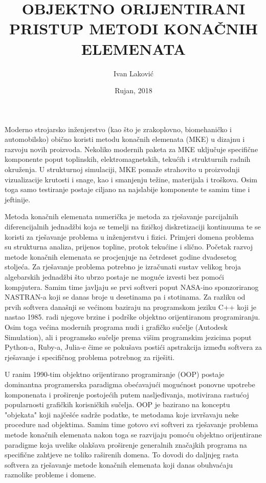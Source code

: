 \documentclass[a4paper,twoside,12pt]{memoir} %
\title{OBJEKTNO ORIJENTIRANI PRISTUP METODI KONAČNIH ELEMENATA}
\author{Ivan Laković}
\date{Rujan, 2018}  %
\begin{document}
\frontmatter


\begin{intro}
Moderno strojarsko inženjerstvo (kao što je zrakoplovno, biomehaničko i automobilsko) obično koristi metodu konačnih elemenata (MKE) u dizajnu i razvoju novih proizvoda. Nekoliko modernih paketa za MKE uključuje specifične komponente poput toplinskih, elektromagnetskih, tekućih i strukturnih radnih okruženja. U strukturnoj simulaciji, MKE pomaže strahovito u proizvodnji vizualizacije krutosti i snage, kao i smanjenju težine, materijala i troškova. Osim toga samo testiranje postaje ciljano na najslabije komponente te samim time i jeftinije. \cite{wiki_fem_18} \par

Metoda konačnih elemenata numerička je metoda za rješavanje parcijalnih diferencijalnih jednadžbi koja se temelji na fizičkoj diskretizaciji kontinuuma te se koristi za rješavanje problema u inženjerstvu i fizici. Primjeri domena problema su strukturna analiza, prijenos topline, protok tekućine i slično. Početak razvoj metode konačnih elemenata se procjenjuje na četrdeset godine dvadesetog stoljeća. Za rješavanje problema potrebno je izračunati sustav velikog broja algebarskih jednadžbi što ubrzo postaje ne moguće izvesti bez pomoći kompjutera. Samim time javljaju se prvi softveri poput NASA-ino sponzoriranog NASTRAN-a koji se danas broje u desetinama pa i stotinama. Za razliku od prvih softvera današnji se većinom baziraju na programskom jeziku C++ koji je nastao 1985. radi njegove brzine i podrške objektno orijentiranom programiranju. Osim toga većina modernih programa nudi i grafičko sučelje (Autodesk Simulation), ali i programsko sučelje prema višim programskim jezicima poput Python-a, Ruby-a, Julia-e čime se pokušava postići apstrakcija između softvera za rješavanje i specifičnog problema potrebnog za riješiti. \cite{wiki_list_of_fem_software} \par

U ranim 1990-tim objektno orijentirano programiranje (OOP) postaje dominantna programerska paradigma obećavajući mogućnost ponovne upotrebe komponenata i proširenje postojećih putem nasljeđivanja, motivirana rastućoj popularnosti grafičkih korisničkih sučelja. OOP je bazirano na konceptu "objekata" koji najčešće sadrže podatke, te metodama koje izvršavaju neke procedure nad objektima. Samim time gotovo svi softveri za rješavanje problema metode konačnih elemenata nakon toga se razvijaju pomoću objektno orijentirane paradigme koja uvelike olakšava proširenje generalnih značajkih programa na specifične zahtjeve ne toliko raširenih domena. To dovodi do daljnjeg rasta softvera za rješavanje metode konačnih elemenata koji danas obuhvaćaju raznolike probleme i domene.  \par


\end{intro}
\end{document}
